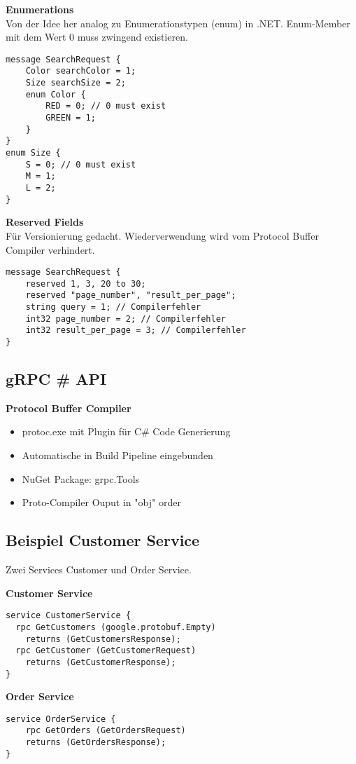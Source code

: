 \textbf{Enumerations}\\
Von  der Idee her analog zu Enumerationstypen (enum) in .NET. Enum-Member mit dem Wert 0 muss zwingend existieren.
\begin{lstlisting}
message SearchRequest {
	Color searchColor = 1;
	Size searchSize = 2;
	enum Color {
		RED = 0; // 0 must exist 
		GREEN = 1;
	}
} 
enum Size {
	S = 0; // 0 must exist
	M = 1;
	L = 2; 
}	
\end{lstlisting} 

\textbf{Reserved Fields}\\
Für Versionierung gedacht. Wiederverwendung wird vom Protocol Buffer Compiler verhindert. 
\begin{lstlisting}
message SearchRequest {
	reserved 1, 3, 20 to 30;
	reserved "page_number", "result_per_page"; 
	string query = 1; // Compilerfehler
	int32 page_number = 2; // Compilerfehler 
	int32 result_per_page = 3; // Compilerfehler
}
\end{lstlisting}

\subsection{gRPC \# API}
\textbf{Protocol Buffer Compiler}
\begin{itemize}
	\item protoc.exe mit Plugin für C\# Code Generierung
	\item Automatische in Build Pipeline eingebunden
	\item NuGet Package: grpc.Tools
	\item Proto-Compiler Ouput in "obj" order
\end{itemize}

\subsection{Beispiel Customer Service}
Zwei Services Customer und Order Service.

\textbf{Customer Service}
\begin{lstlisting}
service CustomerService {
  rpc GetCustomers (google.protobuf.Empty)
    returns (GetCustomersResponse);
  rpc GetCustomer (GetCustomerRequest) 
    returns (GetCustomerResponse);
}
\end{lstlisting}

\textbf{Order Service}
\begin{lstlisting}
service OrderService {
	rpc GetOrders (GetOrdersRequest) 
	returns (GetOrdersResponse);
}
\end{lstlisting}

